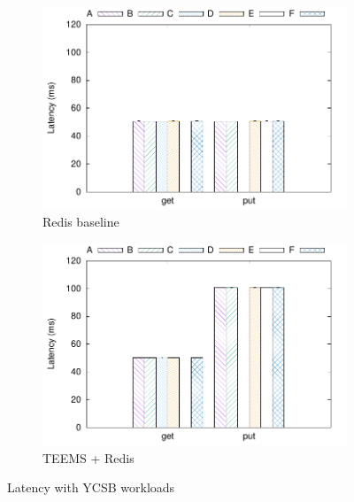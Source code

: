 \begin{figure}[t]
    \centering
    \begin{subfigure}[t]{0.49 * 10cm}
        \centering
        \includegraphics[width=\linewidth]{teem_results/deployment/result/ycsb_redis}
        \caption{Redis baseline}\label{fig:ycsb_redis}
    \end{subfigure}
    \begin{subfigure}[t]{0.49 * 10cm}
        \centering
        \includegraphics[width=\linewidth]{teem_results/deployment/result/ycsb_teems}
        \caption{\ac{TEEMS} + Redis}\label{fig:ycsb_teems}
    \end{subfigure}
    \caption{Latency with \ac{YCSB} workloads}
\end{figure}


